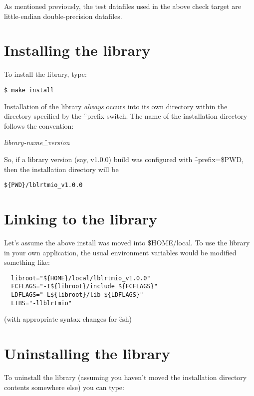 As mentioned previously, the test datafiles used in the above check target are little-endian double-precision datafiles.



\section{Installing the library}

To install the library, type:

\begin{verbatim}$ make install\end{verbatim}

Installation of the library \textit{always} occurs into its own directory within the directory specified by the \f{--prefix} switch. The name of the installation directory follows the convention:

\textit{library-name}\f{\_}\textit{version}

So, if a library version (say, v1.0.0) build was configured with \f{--prefix=\$PWD}, then the installation directory will be

\begin{verbatim}${PWD}/lblrtmio_v1.0.0\end{verbatim}



\section{Linking to the library}

Let's assume the above install was moved into \f{\${HOME}/local}. To use the library in your own application, the usual environment variables would be modified something like:
\begin{verbatim}
  libroot="${HOME}/local/lblrtmio_v1.0.0"
  FCFLAGS="-I${libroot}/include ${FCFLAGS}"
  LDFLAGS="-L${libroot}/lib ${LDFLAGS}"
  LIBS="-llblrtmio"
\end{verbatim}

(with appropriate syntax changes for \f{csh})



\section{Uninstalling the library}

To uninstall the library (assuming you haven't moved the installation directory contents somewhere else) you can type:

